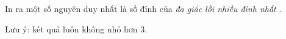 In ra một số nguyên duy nhất là số đỉnh của   \textit{    đa giác lồi nhiều đỉnh nhất   }   .  

   Lưu ý: kết quả luôn không nhỏ hơn 3.